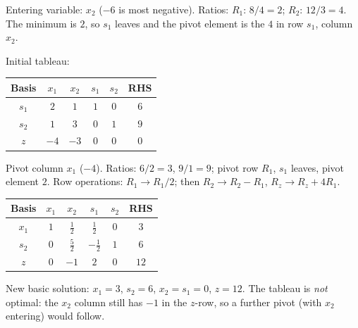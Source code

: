\begin{solutions}
  \item Entering variable: $x_2$ ($-6$ is most negative). Ratios:
        $R_1$: $8/4=2$; $R_2$: $12/3=4$. The minimum is $2$, so $s_1$
        leaves and the pivot element is the $4$ in row $s_1$, column
        $x_2$.

  \item Initial tableau:
        \begin{center}
        \begin{tabular}{c|cccc|c}
        Basis & $x_1$ & $x_2$ & $s_1$ & $s_2$ & RHS\\
        \hline
        $s_1$ & $2$ & $1$ & $1$ & $0$ & $6$\\
        $s_2$ & $1$ & $3$ & $0$ & $1$ & $9$\\
        \hline
        $z$ & $-4$ & $-3$ & $0$ & $0$ & $0$\\
        \end{tabular}
        \end{center}
        Pivot column $x_1$ ($-4$). Ratios: $6/2=3$, $9/1=9$; pivot row
        $R_1$, $s_1$ leaves, pivot element $2$. Row operations:
        $R_1\to R_1/2$; then $R_2\to R_2-R_1$, $R_z\to R_z+4R_1$.
        \begin{center}
        \begin{tabular}{c|cccc|c}
        Basis & $x_1$ & $x_2$ & $s_1$ & $s_2$ & RHS\\
        \hline
        $x_1$ & $1$ & $\tfrac{1}{2}$ & $\tfrac{1}{2}$ & $0$ & $3$\\
        $s_2$ & $0$ & $\tfrac{5}{2}$ & $-\tfrac{1}{2}$ & $1$ & $6$\\
        \hline
        $z$ & $0$ & $-1$ & $2$ & $0$ & $12$\\
        \end{tabular}
        \end{center}
        New basic solution: $x_1=3$, $s_2=6$, $x_2=s_1=0$, $z=12$. The
        tableau is \emph{not} optimal: the $x_2$ column still has $-1$
        in the $z$-row, so a further pivot (with $x_2$ entering) would
        follow.


\end{solutions}
